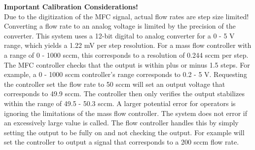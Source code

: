 \textbf{Important Calibration Considerations!}\\
Due to the digitization of the MFC signal, actual flow rates are step size limited! Converting a flow rate to an analog voltage is limited by the precision of the converter. This system uses a 12-bit digital to analog converter for a 0 - 5 V range, which yields a 1.22 mV per step resolution. For a mass flow controller with a range of 0 - 1000 sccm, this corresponds to a resolution of 0.244 sccm per step. The MFC controller checks that the output is within plus or minus 1.5 steps. For example, a 0 - 1000 sccm controller's range corresponds to 0.2 - 5 V. Requesting the controller set the flow rate to 50 sccm will set an output voltage that corresponds to 49.9 sccm. The controller then only verifies the output stabilizes within the range of 49.5 - 50.3 sccm. A larger potential error for operators is ignoring the limitations of the mass flow controller. The system does not error if an excessively large value is called. The flow controller handles this by simply setting the output to be fully on and not checking the output. For example  will set the controller to output a signal that corresponds to a 200 sccm flow rate.
\pagebreak